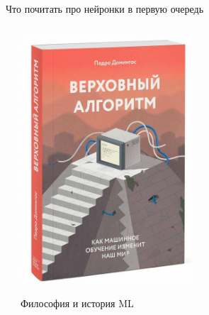\documentclass[notes,12pt, aspectratio=169]{beamer}
\begin{document}
\begin{frame}{Что почитать про нейронки в первую очередь}
\begin{columns}
\begin{column}{0.5\textwidth}
	\end{column}
	\begin{column}{0.5\textwidth}
		\begin{center}
			\includegraphics[width=0.5\textwidth]{book2.jpg}

			\footnotesize Философия и история ML
		\end{center}
	\end{column}
\end{columns}
\end{frame}
\end{document}
